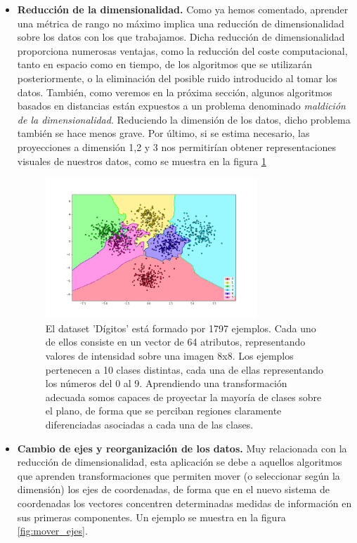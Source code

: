 \begin{itemize}
    \item \textbf{Reducción de la dimensionalidad.} Como ya hemos comentado, aprender una métrica de rango no máximo implica una reducción de dimensionalidad sobre los datos con los que trabajamos. Dicha reducción de dimensionalidad proporciona numerosas ventajas, como la reducción del coste computacional, tanto en espacio como en tiempo, de los algoritmos que se utilizarán posteriormente, o la eliminación del posible ruido introducido al tomar los datos. También, como veremos en la próxima sección, algunos algoritmos basados en distancias están expuestos a un problema denominado \emph{maldición de la dimensionalidad}. Reduciendo la dimensión de los datos, dicho problema también se hace menos grave. Por último, si se estima necesario, las proyecciones a dimensión 1,2 y 3 nos permitirían obtener representaciones visuales de nuestros datos, como se muestra en la figura \ref{fig:reduc_dim}

    \begin{figure}[h]
    \centering
    \includegraphics[width=0.75\textwidth]{./images/ex_red_dim.png}
    \caption{El dataset 'Dígitos' está formado por 1797 ejemplos. Cada uno de ellos consiste en un vector de 64 atributos, representando valores de intensidad sobre una imagen 8x8. Los ejemplos pertenecen a 10 clases distintas, cada una de ellas representando los números del 0 al 9. Aprendiendo una transformación adecuada somos capaces de proyectar la mayoría de clases sobre el plano, de forma que se perciban regiones claramente diferenciadas asociadas a cada una de las clases.} \label{fig:reduc_dim}
    \end{figure}


    \item \textbf{Cambio de ejes y reorganización de los datos.} Muy relacionada con la reducción de dimensionalidad, esta aplicación se debe a aquellos algoritmos que aprenden transformaciones que permiten mover (o seleccionar según la dimensión) los ejes de coordenadas, de forma que en el nuevo sistema de coordenadas los vectores concentren determinadas medidas de información en sus primeras componentes. Un ejemplo se muestra en la figura \ref{fig:mover_ejes}.


\end{itemize}
